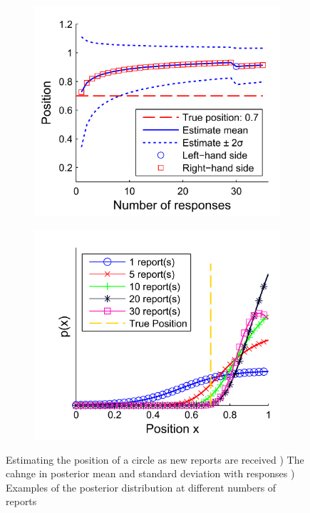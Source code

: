 \begin{figure}
	\centering
	\begin{subfigure}{7cm}
	\includegraphics[scale=1]{line_fusion_responses_07_LR.png}
	\caption{}	
	\label{Figure: fusion_responses_07_varying_LR}
	\end{subfigure}
	\begin{subfigure}{7cm}
	\includegraphics[scale=1]{line_fusion_07_distsLR.png}
	\caption{}
	\label{Figure: fusion_responses_07_dists_LR}	
	\end{subfigure}
	\label{Figure: fusion_responses_07_LR}
	\caption{Estimating the position of a circle as new reports are received ) The cahnge in posterior mean and standard deviation with responses ) Examples of the posterior distribution at different numbers of reports}
\end{figure}






